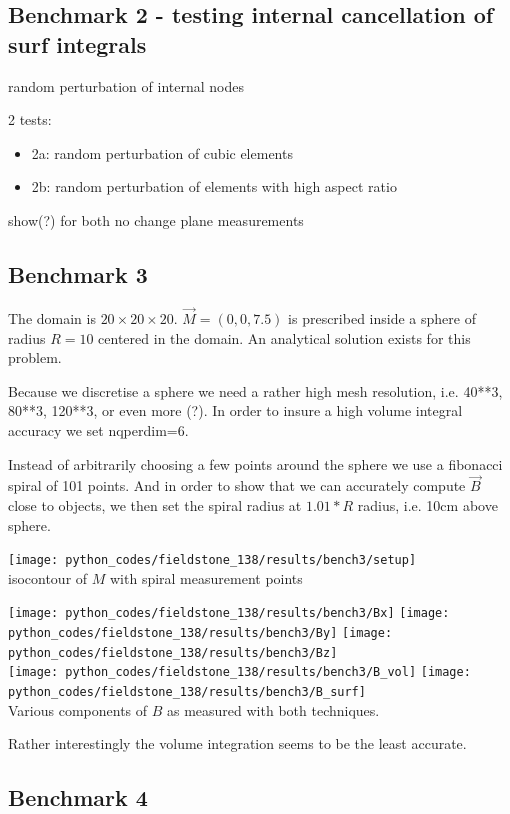 \newpage
\subsection*{Benchmark 2 - testing internal cancellation of surf integrals} 

random perturbation of internal nodes


2 tests:
\begin{itemize}
\item 2a: random perturbation of cubic elements 
\item 2b: random perturbation of elements with high aspect ratio
\end{itemize}
show(?) for both no change plane measurements




\newpage
\subsection*{Benchmark 3}

The domain is $20\times 20\times 20$. 
$\vec{M}=(0,0,7.5)$ is prescribed inside a sphere of radius $R=10$ centered 
in the domain. 
An analytical solution exists for this problem.

Because we discretise a sphere we need a rather high mesh resolution,
i.e. 40**3, 80**3, 120**3, or even more (?).
In order to insure a high volume integral accuracy we set nqperdim=6.

Instead of arbitrarily choosing a few points around the sphere
we use a fibonacci spiral of 101 points. 
And in order to show that we can accurately
compute $\vec{B}$ close to objects, 
we then set the spiral radius at $1.01*R$ radius, i.e. 10cm above sphere.

\begin{center}
\texttt{[image: python\_codes/fieldstone\_138/results/bench3/setup]}\\
{\captionfont isocontour of $M$ with spiral measurement points}
\end{center}

\begin{center}
\texttt{[image: python\_codes/fieldstone\_138/results/bench3/Bx]}
\texttt{[image: python\_codes/fieldstone\_138/results/bench3/By]}
\texttt{[image: python\_codes/fieldstone\_138/results/bench3/Bz]}\\
\texttt{[image: python\_codes/fieldstone\_138/results/bench3/B\_vol]}
\texttt{[image: python\_codes/fieldstone\_138/results/bench3/B\_surf]}\\
{\captionfont Various components of $B$ as measured with both techniques.}
\end{center}

Rather interestingly the volume integration seems to be the least accurate.


\newpage
\subsection*{Benchmark 4}




